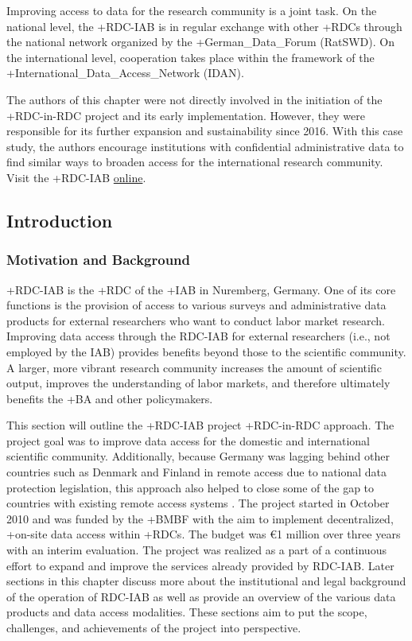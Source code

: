 \documentclass[
]{WileySix}
\begin{document}
Improving access to data for the research community is a joint task. On the national level, the +RDC-IAB\textbar{} is in regular exchange with other +RDC\textbar s through the national network organized by the +German\_Data\_Forum\textbar{} (RatSWD). On the international level, cooperation takes place within the framework of the +International\_Data\_Access\_Network\textbar{} (IDAN).

The authors of this chapter were not directly involved in the initiation of the +RDC-in-RDC\textbar{} project and its early implementation. However, they were responsible for its further expansion and sustainability since 2016. With this case study, the authors encourage institutions with confidential administrative data to find similar ways to broaden access for the international research community. Visit the +RDC-IAB\textbar{} \href{https://fdz.iab.de/en.aspx}{online}.

\hypertarget{introduction-1}{%
\subsection{Introduction}\label{introduction-1}}

\hypertarget{motivation-and-background}{%
\subsubsection{Motivation and Background}\label{motivation-and-background}}

+RDC-IAB\textbar{} is the +RDC\textbar{} of the +IAB\textbar{} in Nuremberg, Germany. One of its core functions is the provision of access to various surveys and administrative data products for external researchers who want to conduct labor market research. Improving data access through the RDC-IAB for external researchers (i.e., not employed by the IAB) provides benefits beyond those to the scientific community. A larger, more vibrant research community increases the amount of scientific output, improves the understanding of labor markets, and therefore ultimately benefits the +BA\textbar{} and other policymakers.

This section will outline the +RDC-IAB\textbar{} project +RDC-in-RDC\textbar{} approach. The project goal was to improve data access for the domestic and international scientific community. Additionally, because Germany was lagging behind other countries such as Denmark and Finland in remote access due to national data protection legislation, this approach also helped to close some of the gap to countries with existing remote access systems \citep{bender2011, wirth2019}. The project started in October 2010 and was funded by the +BMBF\textbar{} with the aim to implement decentralized, +on-site\textbar{} data access within +RDC\textbar s. The budget was €1 million over three years with an interim evaluation. The project was realized as a part of a continuous effort to expand and improve the services already provided by RDC-IAB. Later sections in this chapter discuss more about the institutional and legal background of the operation of RDC-IAB as well as provide an overview of the various data products and data access modalities. These sections aim to put the scope, challenges, and achievements of the project into perspective.
\end{document}
